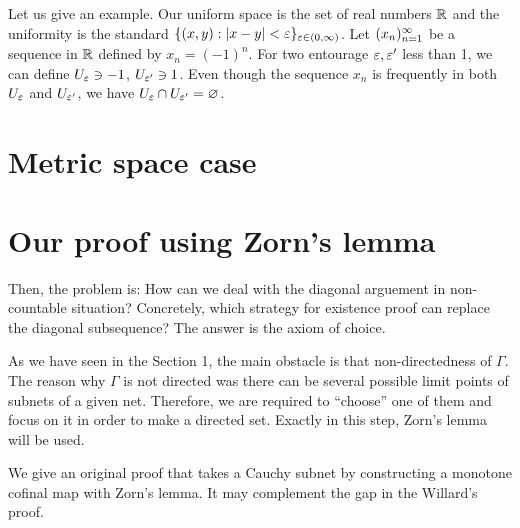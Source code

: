 \documentclass{../exp}
\begin{document}
Let us give an example.
Our uniform space is the set of real numbers $\mathbb{R}$ and the uniformity is the standard $\{(x,y):|x-y|<\varepsilon\}_{\varepsilon\in(0,\infty)}$.
Let $(x_n)_{n=1}^\infty$ be a sequence in $\mathbb{R}$ defined by $x_n=(-1)^n$.
For two entourage $\varepsilon,\varepsilon'$ less than 1, we can define $U_\varepsilon\ni-1$, $U_{\varepsilon'}\ni1$.
Even though the sequence $x_n$ is frequently in both $U_\varepsilon$ and $U_{\varepsilon'}$, we have $U_\varepsilon\cap U_{\varepsilon'}=\varnothing$.





\section{Metric space case}









\section{Our proof using Zorn's lemma}

Then, the problem is:
How can we deal with the diagonal arguement in non-countable situation?
Concretely, which strategy for existence proof can replace the diagonal subsequence?
The answer is the axiom of choice.

As we have seen in the Section 1, the main obstacle is that non-directedness of $\Gamma$.
The reason why $\Gamma$ is not directed was there can be several possible limit points of subnets of a given net.
Therefore, we are required to ``choose'' one of them and focus on it in order to make a directed set.
Exactly in this step, Zorn's lemma will be used.
 
We give an original proof that takes a Cauchy subnet by constructing a monotone cofinal map with Zorn's lemma.
It may complement the gap in the Willard's proof.
\end{document}
